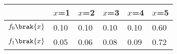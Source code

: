 \begin{tabular}{l|lllll}
\hline
 & $x$=1  & $x$=2  & $x$=3  & $x$=4  & $x$=5  \\ \hline
	$f_{0}\brak{x}$ & 0.10 & 0.10 & 0.10 & 0.10 & 0.60 \\ \hline
	$f_{1}\brak{x}$ & 0.05 & 0.06 & 0.08 & 0.09 & 0.72 \\ \hline
\end{tabular}
